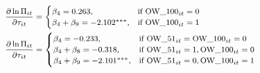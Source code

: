 \documentclass[10pt,twocolumn,oneside,cmyk]{article}
\begin{document}
\begin{equation}\label{eq14}
\footnotesize
 \begin{split}
  & \frac{\partial \ln \Pi_{it}}{\partial \tau_{it}} =
   \begin{cases}
    \beta_4 = 0.263, & \text{if}\ \text{OW\_100}_{it}=0 \\
    \beta_4 + \beta_9 = -2.102^{***}, & \text{if}\ \text{OW\_100}_{it}=1
   \end{cases}\\ 
  &\frac{\partial \ln \Pi_{it}}{\partial \tau_{it}} =
   \begin{cases}
    \beta_4 = -0.233, & \text{if}\ \text{OW\_51}_{it}=\text{OW\_100}_{it}=0 \\
    \beta_4 + \beta_8 = -0.318, & \text{if}\ \text{OW\_51}_{it}=1, \text{OW\_100}_{it}=0 \\
    \beta_4 + \beta_9 = -2.101^{***}, & \text{if}\ \text{OW\_51}_{it}=0, \text{OW\_100}_{it}=1
   \end{cases}
 \end{split}
\end{equation}
\end{document}
